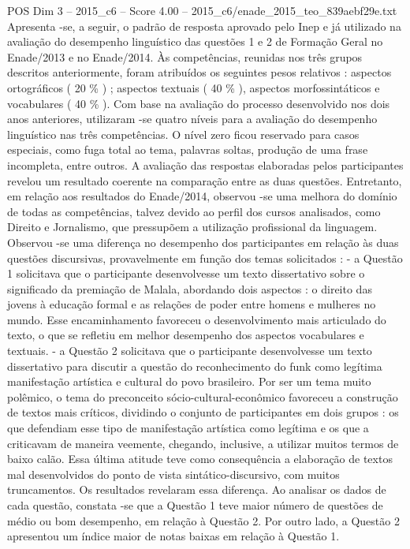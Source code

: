 \begin{textsample}{POS Dim 3 – 2015\_c6 – Score 4.00 – 2015\_c6/enade\_2015\_teo\_839aebf29e.txt}
Apresenta -se, a seguir, o padrão de resposta aprovado pelo Inep e já utilizado na avaliação do desempenho linguístico das questões 1 e 2 de Formação Geral no Enade/2013 e no Enade/2014.
Às competências, reunidas nos três grupos descritos anteriormente, foram atribuídos os seguintes pesos relativos : aspectos ortográficos ( 20 \% ) ; aspectos textuais ( 40 \% ), aspectos morfossintáticos e vocabulares ( 40 \% ).
Com base na avaliação do processo desenvolvido nos dois anos anteriores, utilizaram -se quatro níveis para a avaliação do desempenho linguístico nas três competências.
O nível zero ficou reservado para casos especiais, como fuga total ao tema, palavras soltas, produção de uma frase incompleta, entre outros.
A avaliação das respostas elaboradas pelos participantes revelou um resultado coerente na comparação entre as duas questões.
Entretanto, em relação aos resultados do Enade/2014, observou -se uma melhora do domínio de todas as competências, talvez devido ao perfil dos cursos analisados, como Direito e Jornalismo, que pressupõem a utilização profissional da linguagem.
Observou -se uma diferença no desempenho dos participantes em relação às duas questões discursivas, provavelmente em função dos temas solicitados : - a Questão 1 solicitava que o participante desenvolvesse um texto dissertativo sobre o significado da premiação de Malala, abordando dois aspectos : o direito das jovens à educação formal e as relações de poder entre homens e mulheres no mundo.
Esse encaminhamento favoreceu o desenvolvimento mais articulado do texto, o que se refletiu em melhor desempenho dos aspectos vocabulares e textuais. - a Questão 2 solicitava que o participante desenvolvesse um texto dissertativo para discutir a questão do reconhecimento do funk como legítima manifestação artística e cultural do povo brasileiro.
Por ser um tema muito polêmico, o tema do preconceito sócio-cultural-econômico favoreceu a construção de textos mais críticos, dividindo o conjunto de participantes em dois grupos : os que defendiam esse tipo de manifestação artística como legítima e os que a criticavam de maneira veemente, chegando, inclusive, a utilizar muitos termos de baixo calão.
Essa última atitude teve como consequência a elaboração de textos mal desenvolvidos do ponto de vista sintático-discursivo, com muitos truncamentos.
Os resultados revelaram essa diferença.
Ao analisar os dados de cada questão, constata -se que a Questão 1 teve maior número de questões de médio ou bom desempenho, em relação à Questão 2.
Por outro lado, a Questão 2 apresentou um índice maior de notas baixas em relação à Questão 1.

\end{textsample}
